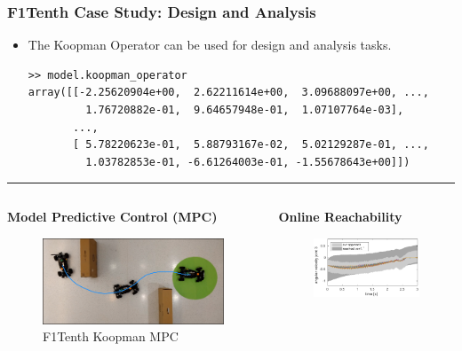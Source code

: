 \documentclass[shortpres,aspectratio=43]{beamer}
\begin{document}
\begin{frame}[fragile]
\frametitle{F1Tenth Case Study: Design and Analysis}
\begin{itemize}
    \item<1-> The Koopman Operator can be used for design and analysis tasks.
	    \vspace{12pt}
\begin{scriptsize}
    \begin{verbatim}
>> model.koopman_operator
array([[-2.25620904e+00,  2.62211614e+00,  3.09688097e+00, ...,
         1.76720882e-01,  9.64657948e-01,  1.07107764e-03],
       ...,
       [ 5.78220623e-01,  5.88793167e-02,  5.02129287e-01, ...,
         1.03782853e-01, -6.61264003e-01, -1.55678643e+00]])
    \end{verbatim}
    \end{scriptsize}
\end{itemize}
\rule{\textwidth}{1pt}
\vspace{-0.25cm}
\begin{columns}
	\begin{column}{0.55\linewidth}
\textbf{Model Predictive Control (MPC)} 
\begin{figure}
	\centering
\includegraphics[width=0.8\linewidth]{./img/F1tenth.eps}
\caption{F1Tenth Koopman MPC}
\end{figure}
	\end{column}
	\begin{column}{0.45\linewidth}
\textbf{Online Reachability} 
\begin{figure}
	\centering
\includegraphics[width=0.95\linewidth]{img/results.pdf}

\end{figure}
\end{column}
\end{columns}
\end{frame}
\end{document}
